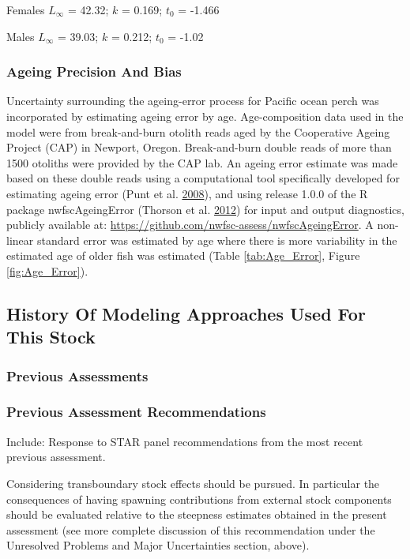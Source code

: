 \documentclass[12pt,]{article}
\begin{document}
Females \(L_{\infty}\) = 42.32; \(k\) = 0.169; \(t_0\) = -1.466

Males \(L_{\infty}\) = 39.03; \(k\) = 0.212; \(t_0\) = -1.02

\subsubsection{Ageing Precision And
Bias}\label{ageing-precision-and-bias}

Uncertainty surrounding the ageing-error process for Pacific ocean perch
was incorporated by estimating ageing error by age. Age-composition data
used in the model were from break-and-burn otolith reads aged by the
Cooperative Ageing Project (CAP) in Newport, Oregon. Break-and-burn
double reads of more than 1500 otoliths were provided by the CAP lab. An
ageing error estimate was made based on these double reads using a
computational tool specifically developed for estimating ageing error
(Punt et al. \protect\hyperlink{ref-punt_quantifying_2008}{2008}), and
using release 1.0.0 of the R package nwfscAgeingError (Thorson et al.
\protect\hyperlink{ref-thorson_nwfscageingerror:_2012}{2012}) for input
and output diagnostics, publicly available at:
\url{https://github.com/nwfsc-assess/nwfscAgeingError}. A non-linear
standard error was estimated by age where there is more variability in
the estimated age of older fish was estimated (Table
\ref{tab:Age_Error}, Figure \ref{fig:Age_Error}).

\subsection{History Of Modeling Approaches Used For This
Stock}\label{history-of-modeling-approaches-used-for-this-stock}

\subsubsection{Previous Assessments}\label{previous-assessments}

\subsubsection{Previous Assessment
Recommendations}\label{previous-assessment-recommendations}

Include: Response to STAR panel recommendations from the most recent
previous assessment.

Considering transboundary stock effects should be pursued. In particular
the consequences of having spawning contributions from external stock
components should be evaluated relative to the steepness estimates
obtained in the present assessment (see more complete discussion of this
recommendation under the Unresolved Problems and Major Uncertainties
section, above).
\end{document}
